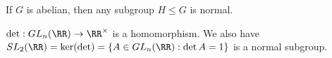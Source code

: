\begin{rem}
If $G$ is abelian, then any subgroup $H \leq G$ is normal.
\end{rem}

\begin{ex}
$\det : GL_n(\RR) \to \RR^\times$ is a homomorphism. We also have
$SL_2(\RR) = \ker(\det) = \lbrace A \in GL_n(\RR) : \det A = 1 \rbrace$
is a normal subgroup.
\end{ex}
